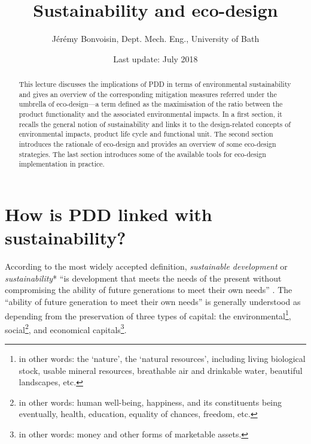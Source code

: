 \documentclass{article}
\newcommand{\subtitle}[1]{%
  \posttitle{%
    \par\end{center}
    \begin{center}\large#1\end{center}
    \vskip0.5em}%
}
\begin{document}
\title{Sustainability and eco-design}
\author{Jérémy Bonvoisin, Dept. Mech. Eng., University of Bath}
\date{Last update: July 2018}

\maketitle

\begin{abstract}
This lecture discusses the implications of PDD in terms of environmental sustainability and gives an overview of the corresponding mitigation measures referred under the umbrella of eco-design---a term defined as the maximisation of the ratio between the product functionality and the associated environmental impacts. In a first section, it recalls the general notion of sustainability and links it to the design-related concepts of environmental impacts, product life cycle and functional unit. The second section introduces the rationale of eco-design and provides an overview of some eco-design strategies. The last section introduces some of the available tools for eco-design implementation in practice. 
\end{abstract}

\section{How is PDD linked with sustainability?}
\label{sec:sustainability}

According to the most widely accepted definition, \emph{sustainable development} or \emph{sustainability}* ``is development that meets the needs of the present without compromising the ability of future generations to meet their own needs'' \cite{brundtland1987our}. The ``ability of future generation to meet their own needs'' is generally understood as depending from the preservation of three types of capital: the environmental\footnote{in other words: the `nature', the `natural resources', including living biological stock, usable mineral resources, breathable air and drinkable water, beautiful landscapes, etc.}, social\footnote{in other words: human well-being, happiness, and its constituents being eventually, health, education, equality of chances, freedom, etc.}, and economical capitals\footnote{in other words: money and other forms of marketable assets.}. 
\end{document}
